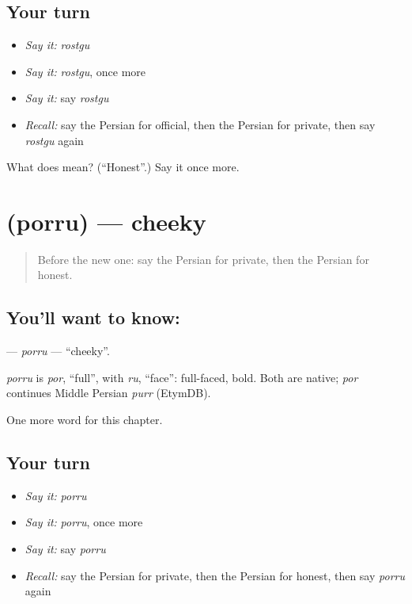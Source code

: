 \subsection*{Your turn}
\begin{itemize}
\raggedright
  \item \emph{Say it:} \emph{rostgu}
  \item \emph{Say it:} \emph{rostgu}, once more
  \item \emph{Say it:} say \emph{rostgu}
  \item \emph{Recall:} say the Persian for official, then the Persian for private, then say \emph{rostgu} again
\end{itemize}

\begin{tcolorbox}[breakable,colback=teal!4,colframe=teal!35!black,title={Before you move on}]
What does  mean? (\textquotedblleft{}Honest\textquotedblright{}.) Say it once more.
\end{tcolorbox}
\section[\texorpdfstring{\fa{پررو} (porru)}{پررو (porru)}]{ (porru) — cheeky}

\label{lesson:FA-C272-porru}



\begin{quote}
Before the new one: say the Persian for private, then the Persian for honest.
\end{quote}

\subsection*{You'll want to know: }
\textbf{} — \emph{porru} — \textquotedblleft{}cheeky\textquotedblright{}.

\begin{cousinweb}
\emph{porru} is \emph{por}, \textquotedblleft{}full\textquotedblright{}, with \emph{ru}, \textquotedblleft{}face\textquotedblright{}: full-faced, bold. Both are native; \emph{por} continues Middle Persian \emph{purr} (EtymDB).
\end{cousinweb}

\begin{grammarlens}[title={What you've built}]
One more word for this chapter.
\end{grammarlens}

\subsection*{Your turn}
\begin{itemize}
\raggedright
  \item \emph{Say it:} \emph{porru}
  \item \emph{Say it:} \emph{porru}, once more
  \item \emph{Say it:} say \emph{porru}
  \item \emph{Recall:} say the Persian for private, then the Persian for honest, then say \emph{porru} again
\end{itemize}

